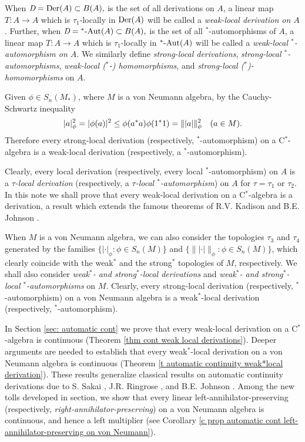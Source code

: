 \documentclass[11pt]{amsart}
\begin{document}
When $\emph{D} = \hbox{Der}(A)\subset B(A),$ is the set of all derivations on $A$, a linear map $T: A\to A$ which is $\tau_1$-locally in $\hbox{Der}(A)$ will be called a \emph{weak-local derivation on $A$}. Further, when $\emph{D} = \hbox{$^*$-Aut}(A)\subset B(A),$ is the set of all $^*$-automorphisms of $A$, a linear map $T: A\to A$ which is $\tau_1$-locally in $\hbox{$^*$-Aut}(A)$ will be called a \emph{weak-local $^*$-automorphism on $A$}. We similarly define \emph{strong-local derivations}, \emph{strong-local $^*$-automorphisms}, \emph{weak-local {\rm(}$^*$-{\rm)} homomorphisms}, and \emph{strong-local {\rm(}$^*${\rm)}-homomorphisms} on $A$.\smallskip

Given $\phi \in S_n(M_*)$, where $M$ is a von Neumann algebra, by the Cauchy-Schwartz inequality $$|a|_{\phi}^2= |\phi (a)|^2 \leq \phi (a^* a) \phi (1^* 1) = \|| a |\|_{\phi}^2 \ \ \ {\rm(} a\in M {\rm ).}$$ Therefore every strong-local derivation (respectively, $^*$-automorphism) on a C$^*$-algebra is a weak-local derivation  (respectively, a $^*$-automorphism).\smallskip

Clearly, every local derivation (respectively, every local $^*$-automorphism) on $A$ is a \emph{$\tau$-local derivation} (respectively, a \emph{$\tau$-local $^*$-automorphism}) on $A$ for $\tau= \tau_1$ or $\tau_2.$ In this note we shall prove that every weak-local derivation on a C$^*$-algebra is a derivation, a result which extends the famous theorems of R.V. Kadison \cite{Kad90} and B.E. Johnson \cite{John01}.\smallskip

When $M$ is a von Neumann algebra, we can also consider the topologies $\tau_3$ and $\tau_4$ generated by the families $\{  |\cdot|_{\phi} : \phi\in S_n (M)\}$ and $\{\||\cdot|\|_{\phi} : \phi\in S_n(M) \}$, which clearly coincide with the weak$^*$ and the strong$^*$ topologies of $M$, respectively. We shall also consider \emph{weak$^*$- and strong$^*$-local derivations} and \emph{weak$^*$- and strong$^*$-local $^*$-automorphisms} on $M$. Clearly, every strong-local derivation (respectively, $^*$-automorphism) on a von Neumann algebra is a weak$^*$-local derivation  (respectively, $^*$-automorphism).\smallskip

In Section \ref{sec: automatic cont} we prove that every weak-local derivation on a C$^*$-algebra is continuous (Theorem \ref{thm cont weak local derivations}). Deeper arguments are needed to establish that every weak$^*$-local derivation on a von Neumann algebra is continuous (Theorem \ref{t automatic continuity weak*local derivation}). These results generalize classical results on automatic continuity derivations due to S. Sakai \cite{Sak60}, J.R. Ringrose \cite{Ringrose72}, and B.E. Johnson \cite{John01}. Among the new tolls developed in section, we show that every linear left-annihilator-preserving (respectively, \emph{right-annihilator-preserving}) on a von Neumann algebra is continuous, and hence a left multiplier (see Corollary \ref{c prop automatic cont left-annihilator-preserving on  von Neumann}).\smallskip
\end{document}
